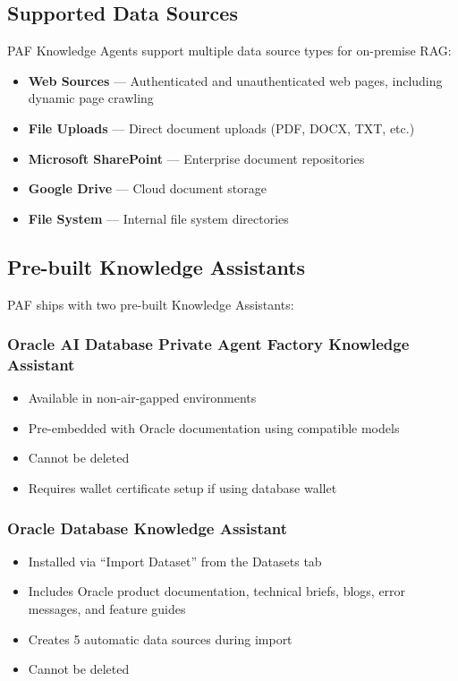 \documentclass[12pt,a4paper]{article}
\begin{document}
\subsection{Supported Data Sources}

PAF Knowledge Agents support multiple data source types for on-premise RAG:

\begin{itemize}
  \item \textbf{Web Sources} — Authenticated and unauthenticated web pages, including dynamic page crawling
  \item \textbf{File Uploads} — Direct document uploads (PDF, DOCX, TXT, etc.)
  \item \textbf{Microsoft SharePoint} — Enterprise document repositories
  \item \textbf{Google Drive} — Cloud document storage
  \item \textbf{File System} — Internal file system directories
\end{itemize}

\subsection{Pre-built Knowledge Assistants}

PAF ships with two pre-built Knowledge Assistants:

\subsubsection{Oracle AI Database Private Agent Factory Knowledge Assistant}
\begin{itemize}
  \item Available in non-air-gapped environments
  \item Pre-embedded with Oracle documentation using compatible models
  \item Cannot be deleted
  \item Requires wallet certificate setup if using database wallet
\end{itemize}

\subsubsection{Oracle Database Knowledge Assistant}
\begin{itemize}
  \item Installed via ``Import Dataset'' from the Datasets tab
  \item Includes Oracle product documentation, technical briefs, blogs, error messages, and feature guides
  \item Creates 5 automatic data sources during import
  \item Cannot be deleted
\end{itemize}
\end{document}
